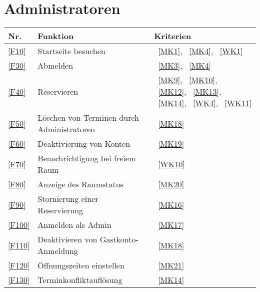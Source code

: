 \section{Administratoren}\label{sec:adminfunktionen}

\begin{table}[htbp]
    \centering
    \begin{tabularx}{\textwidth}{ l|X|>{\raggedright\arraybackslash}X  }
        \textbf{Nr.} & \textbf{Funktion} & \textbf{Kriterien} \\ \hline\hline
        \ref{F10} & Startseite besuchen &~\ref{MK1}, ~\ref{MK4}, ~\ref{WK1} \\
        \ref{F30} & Abmelden &~\ref{MK3}, ~\ref{MK4} \\
        \ref{F40} & Reservieren &~\ref{MK9}, ~\ref{MK10}, ~\ref{MK12}, ~\ref{MK13}, ~\ref{MK14}, ~\ref{WK4}, ~\ref{WK11} \\
        \ref{F50} & Löschen von Terminen durch Administratoren &~\ref{MK18} \\
        \ref{F60} & Deaktivierung von Konten &~\ref{MK19} \\
        \ref{F70} & Benachrichtigung bei freiem Raum &~\ref{WK10} \\
        \ref{F80} & Anzeige des Raumstatus &~\ref{MK20} \\
        \ref{F90} & Stornierung einer Reservierung &~\ref{MK16} \\
        \ref{F100} & Anmelden als Admin &~\ref{MK17} \\
        \ref{F110} & Deaktivieren von Gastkonto-Anmeldung &~\ref{MK18} \\
        \ref{F120} & Öffnungszeiten einstellen &~\ref{MK21} \\
        \ref{F130} & Terminkonfliktauflösung &~\ref{MK14} \\
    \end{tabularx}
    \label{tab:adminfunctions}
\end{table}



